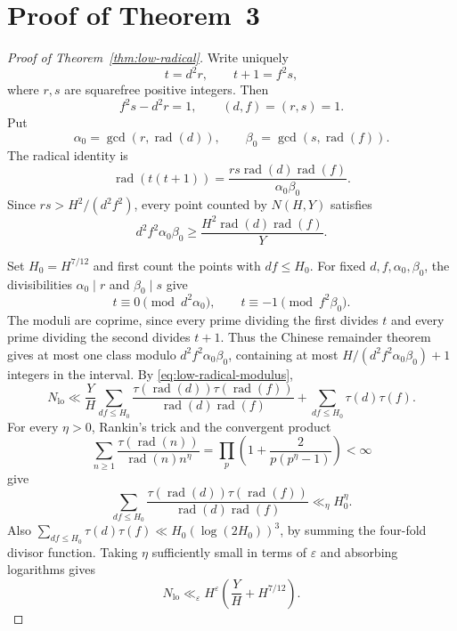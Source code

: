 \section{Proof of Theorem~3}\label{app:low-radical-proof}

\begin{proof}[Proof of Theorem~\ref{thm:low-radical}]
Write uniquely
\[
t=d^2r,\qquad t+1=f^2s,
\]
where $r,s$ are squarefree positive integers. Then
\begin{equation}\label{eq:low-radical-pell}
f^2s-d^2r=1,\qquad (d,f)=(r,s)=1.
\end{equation}
Put
\[
\alpha_0=\gcd(r,\operatorname{rad}(d)),\qquad
\beta_0=\gcd(s,\operatorname{rad}(f)).
\]
The radical identity is
\begin{equation}\label{eq:low-radical-identity}
\operatorname{rad}(t(t+1))
=\frac{rs\operatorname{rad}(d)\operatorname{rad}(f)}{\alpha_0\beta_0}.
\end{equation}
Since $rs>H^2/(d^2f^2)$, every point counted by $N(H,Y)$ satisfies
\begin{equation}\label{eq:low-radical-modulus}
d^2f^2\alpha_0\beta_0\ge
\frac{H^2\operatorname{rad}(d)\operatorname{rad}(f)}{Y}.
\end{equation}

Set $H_0=H^{7/12}$ and first count the points with $df\le H_0$. For fixed
$d,f,\alpha_0,\beta_0$, the divisibilities $\alpha_0\mid r$ and $\beta_0\mid s$ give
\[
t\equiv0\pmod{d^2\alpha_0},\qquad t\equiv-1\pmod{f^2\beta_0}.
\]
The moduli are coprime, since every prime dividing the first divides $t$
and every prime dividing the second divides $t+1$. Thus the Chinese
remainder theorem gives at most one class modulo $d^2f^2\alpha_0\beta_0$,
containing at most $H/(d^2f^2\alpha_0\beta_0)+1$ integers in the interval. By
\eqref{eq:low-radical-modulus},
\begin{equation}\label{eq:low-radical-small-product}
N_{\mathrm{lo}}\ll
\frac YH\sum_{df\le H_0}
 \frac{\tau(\operatorname{rad}(d))\tau(\operatorname{rad}(f))}
      {\operatorname{rad}(d)\operatorname{rad}(f)}
 +\sum_{df\le H_0}\tau(d)\tau(f).
\end{equation}
For every $\eta>0$, Rankin's trick and the convergent product
\[
\sum_{n\ge1}\frac{\tau(\operatorname{rad}(n))}
                   {\operatorname{rad}(n)n^\eta}
=\prod_p\left(1+\frac{2}{p(p^\eta-1)}\right)<\infty
\]
give
\[
\sum_{df\le H_0}
 \frac{\tau(\operatorname{rad}(d))\tau(\operatorname{rad}(f))}
      {\operatorname{rad}(d)\operatorname{rad}(f)}
\ll_\eta H_0^\eta.
\]
Also $\sum_{df\le H_0}\tau(d)\tau(f)\ll H_0(\log(2H_0))^3$, by summing
the four-fold divisor function. Taking $\eta$ sufficiently small in
terms of $\varepsilon$ and absorbing logarithms gives
\begin{equation}\label{eq:low-radical-low-bound}
N_{\mathrm{lo}}\ll_\varepsilon
H^\varepsilon\left(\frac YH+H^{7/12}\right).
\end{equation}


\end{proof}
